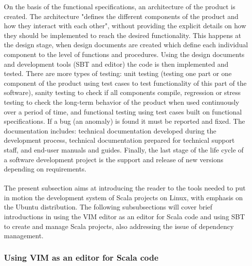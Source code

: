 \documentclass {article}
\begin{document}
On the basis of the functional specifications, an architecture of the product is created. 
The architecture "defines the different components of the product and how they interact with each other", without providing the explicit details on how they should be implemented to reach the desired functionality.
 This happens at the design stage, when design documents are created which define each individual component to the level of functions and procedures.
 Using the design documents and development tools (SBT and editor) the code is then implemented and tested.
 There are more types of testing: unit testing (testing one part or one component of the product using test cases to test functionality of this part of the software), sanity testing to check if all components compile, regression or stress testing to check the long-term behavior of the product when used continuously over a period of time, and functional testing using test cases built on functional specifications.
 If a bug (an anomaly) is found it must be reported and fixed. The documentation includes: technical documentation developed during the development process, technical documentation prepared for technical support staff, and end-user manuals and guides. 
Finally, the last stage of the life cycle of a software development project is the support and release of new versions depending on requirements.       
\\
\\
The present subsection aims at introducing the reader to the tools needed to put in motion the development system of Scala projects on Linux, with emphasis on the Ubuntu distribution.      
The following subsubsections will cover brief introductions in using the VIM editor as an editor for Scala code and using SBT to create and manage Scala projects, also addressing the issue of dependency management.

\subsubsection{Using VIM as an editor for Scala code}
\end{document}
